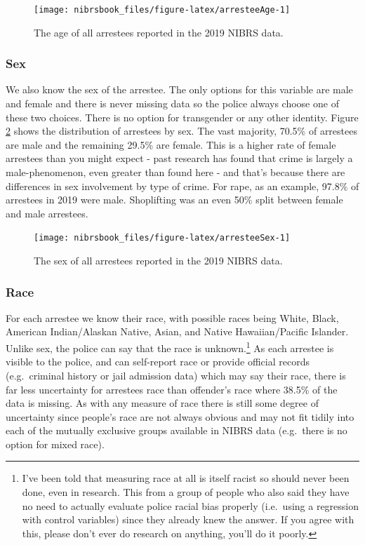 \documentclass[
  12pt,
  openany]{book}
\begin{document}
\begin{figure}

{\centering \texttt{[image: nibrsbook\_files/figure-latex/arresteeAge-1]} 

}

\caption{The age of all arrestees reported in the 2019 NIBRS data.}\label{fig:arresteeAge}
\end{figure}

\hypertarget{sex-2}{%
\subsubsection{Sex}\label{sex-2}}

We also know the sex of the arrestee. The only options for this variable are male and female and there is never missing data so the police always choose one of these two choices. There is no option for transgender or any other identity. Figure \ref{fig:arresteeSex} shows the distribution of arrestees by sex. The vast majority, 70.5\% of arrestees are male and the remaining 29.5\% are female. This is a higher rate of female arrestees than you might expect - past research has found that crime is largely a male-phenomenon, even greater than found here - and that's because there are differences in sex involvement by type of crime. For rape, as an example, 97.8\% of arrestees in 2019 were male. Shoplifting was an even 50\% split between female and male arrestees.

\begin{figure}

{\centering \texttt{[image: nibrsbook\_files/figure-latex/arresteeSex-1]} 

}

\caption{The sex of all arrestees reported in the 2019 NIBRS data.}\label{fig:arresteeSex}
\end{figure}

\hypertarget{race-2}{%
\subsubsection{Race}\label{race-2}}

For each arrestee we know their race, with possible races being White, Black, American Indian/Alaskan Native, Asian, and Native Hawaiian/Pacific Islander. Unlike sex, the police can say that the race is unknown.\footnote{I've been told that measuring race at all is itself racist so should never been done, even in research. This from a group of people who also said they have no need to actually evaluate police racial bias properly (i.e.~using a regression with control variables) since they already knew the answer. If you agree with this, please don't ever do research on anything, you'll do it poorly.} As each arrestee is visible to the police, and can self-report race or provide official records (e.g.~criminal history or jail admission data) which may say their race, there is far less uncertainty for arrestees race than offender's race where 38.5\% of the data is missing. As with any measure of race there is still some degree of uncertainty since people's race are not always obvious and may not fit tidily into each of the mutually exclusive groups available in NIBRS data (e.g.~there is no option for mixed race).
\end{document}
